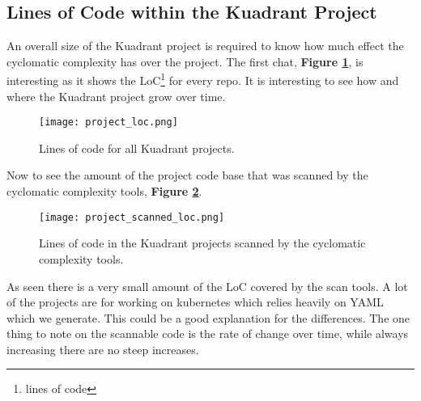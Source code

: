 \subsection{Lines of Code within the Kuadrant Project}
An overall size of the Kuadrant project is required to know how much effect the cyclomatic complexity has over the project.
The first chat, \textbf{Figure \ref{fig:project_loc}}, is interesting as it shows the LoC\footnote{lines of code} for every repo.
It is interesting to see how and where the Kuadrant project grow over time.

\begin{figure}
	\texttt{[image: project\_loc.png]}
	\caption{Lines of code for all Kuadrant projects.}
	\label{fig:project_loc}
\end{figure}

Now to see the amount of the project code base that was scanned by the cyclomatic complexity tools, \textbf{Figure \ref{fig:project_scanned_loc}}.

\begin{figure}
	\texttt{[image: project\_scanned\_loc.png]}
	\caption{Lines of code in the Kuadrant projects scanned by the cyclomatic complexity tools.}
	\label{fig:project_scanned_loc}
\end{figure}

As seen there is a very small amount of the LoC covered by the scan tools.
A lot of the projects are for working on kubernetes which relies heavily on YAML which we generate.
This could be a good explanation for the differences.
The one thing to note on the scannable code is the rate of change over time, while always increasing there are no steep increases.

